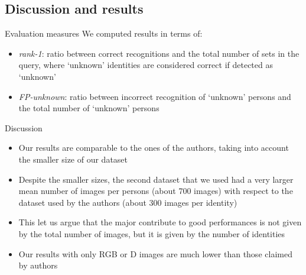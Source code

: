 \documentclass[unknownkeysallowed]{beamer}
\begin{document}
\subsection{Discussion and results}
\begin{frame}{Evaluation measures}
	We computed results in terms of:
	\begin{itemize}
		\item \textit{rank-1}: ratio between correct recognitions and
			the total number of sets in the query, where `unknown'
			identities are considered correct if detected as
			`unknown'
		\item \textit{FP-unknown}: ratio between incorrect recognition
			of `unknown' persons and the total number of `unknown'
			persons
	\end{itemize}
\end{frame}

\begin{frame}{Discussion}
	\begin{itemize}
		\item Our results are comparable to the ones of the authors,
			taking into account the smaller size of our
			dataset
		\item Despite the smaller sizes, the second dataset that we
			used had a very larger mean number of images per
			persons (about 700 images) with respect to the dataset
			used by the authors (about 300 images per identity)
		\item This let us argue that the major contribute to good
			performances is not given by the total number of images,
			but it is given by the number of identities
		\item Our results with only RGB or D images are much lower than
			those claimed by authors
	\end{itemize}
\end{frame}
\end{document}
